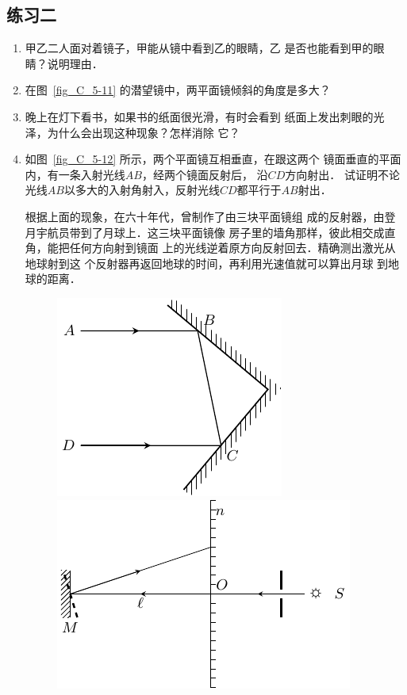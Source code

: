 \subsection*{练习二}
\begin{enumerate}
    \item 甲乙二人面对着镜子，甲能从镜中看到乙的眼睛，乙
    是否也能看到甲的眼睛？说明理由．
    \item 在图~\ref{fig_C_5-11} 的潜望镜中，两平面镜倾斜的角度是多大？
    \item 晚上在灯下看书，如果书的纸面很光滑，有时会看到
    纸面上发出刺眼的光泽，为什么会出现这种现象？怎样消除
    它？
    \item 如图~\ref{fig_C_5-12} 所示，两个平面镜互相垂直，在跟这两个
    镜面垂直的平面内，有一条入射光线$AB$，经两个镜面反射后，
    沿$CD$方向射出．
    试证明不论光线$AB$以多大的入射角射入，反射光线$CD$都平行于$AB$射出．
    
    根据上面的现象，在六十年代，曾制作了由三块平面镜组
    成的反射器，由登月宇航员带到了月球上．这三块平面镜像
    房子里的墙角那样，彼此相交成直角，能把任何方向射到镜面
    上的光线逆着原方向反射回去．精确测出激光从地球射到这
    个反射器再返回地球的时间，再利用光速值就可以算出月球
    到地球的距离．
    
    \begin{figure}[htbp]
    	\centering
    	\begin{minipage}[t]{0.48\textwidth}
    		\centering
    		\includegraphics{fig/C/5-12.pdf}
    		\caption{}\label{fig_C_5-12}
    	\end{minipage}
    	\begin{minipage}[t]{0.48\textwidth}
    		\centering
    		\includegraphics{fig/C/5-13.pdf}
    		\caption{}\label{fig_C_5-13}
    	\end{minipage}
    \end{figure}
    

\end{enumerate}
